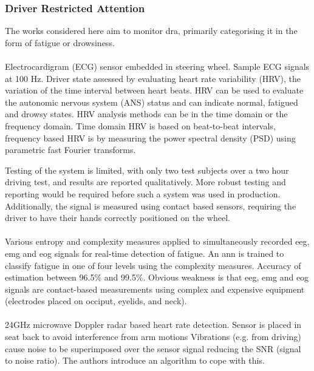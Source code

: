 \documentclass[11pt, parskip=half*,twoside=false]{scrbook}
\begin{document}
 
\subsubsection{Driver Restricted Attention}
The works considered here aim to monitor \gls{dra}, primarily categorising it in the form of fatigue or drowsiness.
 
 \paragraph{\citet{jungDriverFatigueDrowsiness2014}} Electrocardigram (ECG) sensor embedded in steering wheel. Sample ECG signals at 100 Hz. Driver state assessed by evaluating heart rate variability (HRV), the variation of the time interval between heart beats. HRV can be used to evaluate the autonomic nervous system (ANS) status and can indicate normal, fatigued and drowsy states. HRV analysis methods can be in the time domain or the frequency domain. Time domain HRV is based on beat-to-beat intervals, frequency based HRV is by measuring the power spectral density (PSD) using parametric fast Fourier transforms.
 
 Testing of the system is limited, with only two test subjects over a two hour driving test, and results are reported qualitatively. More robust testing and reporting would be required before such a system was used in production. Additionally, the signal is measured using contact based sensors, requiring the driver to have their hands correctly positioned on the wheel. 
 
\paragraph{\citet{zhangAutomatedDetectionDriver2014}} Various entropy and complexity measures applied to simultaneously recorded \gls{eeg}, \gls{emg} and \gls{eog} signals for real-time detection of fatigue. An \gls{ann} is trained to classify fatigue in one of four levels using the complexity measures. Accuracy of estimation between 96.5\% and 99.5\%. Obvious weakness is that \gls{eeg}, \gls{emg} and \gls{eog} signals are contact-based measurements using complex and expensive equipment (electrodes placed on occiput, eyelids, and neck). 

\paragraph{\citet{tsuchiyaHeartbeatDetectionTechnology2020}} 24GHz microwave Doppler radar based heart rate detection. Sensor is placed in seat back to avoid interference from arm motions  Vibrations (e.g. from driving) cause noise to be superimposed over the sensor signal reducing the SNR (signal to noise ratio). The authors introduce an algorithm to cope with this. 
\end{document}
